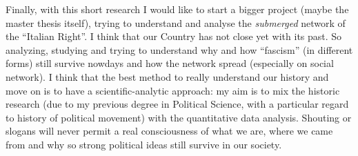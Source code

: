 \documentclass[
]{article}
\begin{document}
Finally, with this short research I would like to start a bigger project
(maybe the master thesis itself), trying to understand and analyse the
\emph{submerged} network of the ``Italian Right''. I think that our
Country has not close yet with its past. So analyzing, studying and
trying to understand why and how ``fascism'' (in different forms) still
survive nowdays and how the network spread (especially on social
network). I think that the best method to really understand our history
and move on is to have a scientific-analytic approach: my aim is to mix
the historic research (due to my previous degree in Political Science,
with a particular regard to history of political movement) with the
quantitative data analysis. Shouting or slogans will never permit a real
consciousness of what we are, where we came from and why so strong
political ideas still survive in our society.
\end{document}
